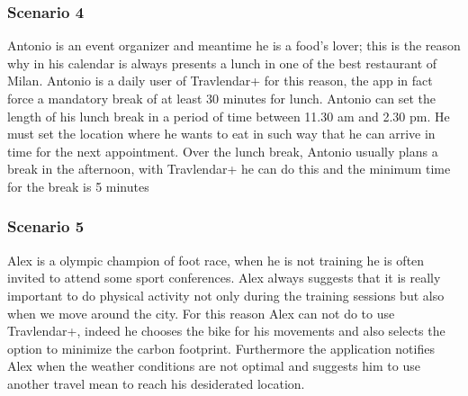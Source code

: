 \subsubsection{Scenario 4}
Antonio is an event organizer and meantime he is a food’s lover; this is the reason why in his calendar is always presents a lunch in one of the best restaurant of Milan. Antonio is a daily user of Travlendar+ for this reason, the app in fact force a mandatory break of at least 30 minutes for lunch. Antonio can set the length of his lunch break in a period of time between 11.30 am and 2.30 pm. He must set the location where he wants to eat in such way that he can arrive in time for the next appointment. Over the lunch break, Antonio usually plans a break in the afternoon, with Travlendar+ he can do this and the minimum time for the break is 5 minutes

\subsubsection{Scenario 5}
Alex is a olympic champion of foot race, when he is not training he is often invited to attend some sport conferences. Alex always suggests that it is really important to do physical activity not only during the training sessions but also when we move around the city. For this reason Alex can not do to use Travlendar+, indeed he chooses the bike for his movements and also selects the option to minimize the carbon footprint. Furthermore the application notifies Alex when the weather conditions are not optimal and suggests him to use another travel mean to reach his desiderated location.
